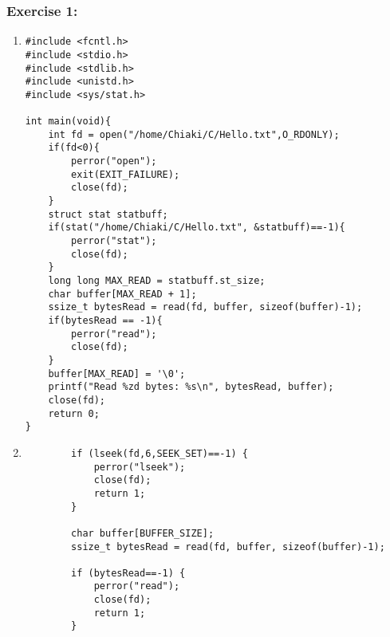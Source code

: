 \documentclass{article}
\begin{document}
\subsubsection{Exercise 1:}
\begin{enumerate}
    \item \begin{verbatim}
#include <fcntl.h>
#include <stdio.h>
#include <stdlib.h>
#include <unistd.h>
#include <sys/stat.h>

int main(void){
    int fd = open("/home/Chiaki/C/Hello.txt",O_RDONLY);
    if(fd<0){
        perror("open");
        exit(EXIT_FAILURE);
        close(fd);
    }
    struct stat statbuff;
    if(stat("/home/Chiaki/C/Hello.txt", &statbuff)==-1){
        perror("stat");
        close(fd);
    }
    long long MAX_READ = statbuff.st_size;
    char buffer[MAX_READ + 1];
    ssize_t bytesRead = read(fd, buffer, sizeof(buffer)-1);
    if(bytesRead == -1){
        perror("read");
        close(fd);
    }
    buffer[MAX_READ] = '\0';
    printf("Read %zd bytes: %s\n", bytesRead, buffer);
    close(fd);
    return 0;
}
    \end{verbatim}
    \item \begin{verbatim}
        if (lseek(fd,6,SEEK_SET)==-1) {
            perror("lseek");
            close(fd);
            return 1;
        }
    
        char buffer[BUFFER_SIZE];
        ssize_t bytesRead = read(fd, buffer, sizeof(buffer)-1);
    
        if (bytesRead==-1) {
            perror("read");
            close(fd);
            return 1;
        }
    \end{verbatim}
\end{enumerate}
\end{document}
